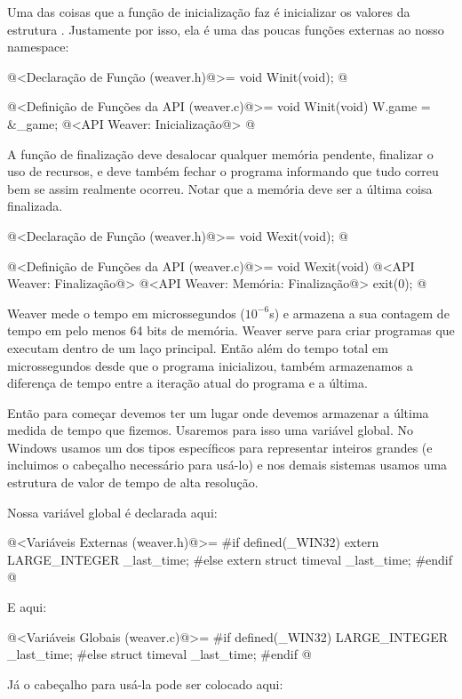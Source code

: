 Uma das coisas que a função de inicialização faz é inicializar os
valores da estrutura . Justamente por isso, ela é uma
das poucas funções externas ao nosso namespace:

\iniciocodigo
@<Declaração de Função (weaver.h)@>=
void Winit(void);
@
\fimcodigo

\iniciocodigo
@<Definição de Funções da API (weaver.c)@>=
void Winit(void){
  W.game = &_game;
  @<API Weaver: Inicialização@>
}
@
\fimcodigo

A função de finalização deve desalocar qualquer memória pendente,
finalizar o uso de recursos, e deve também fechar o programa
informando que tudo correu bem se assim realmente ocorreu. Notar que a
memória deve ser a última coisa finalizada.

\iniciocodigo
@<Declaração de Função (weaver.h)@>=
void Wexit(void);
@
\fimcodigo

\iniciocodigo
@<Definição de Funções da API (weaver.c)@>=
void Wexit(void){
  @<API Weaver: Finalização@>
  @<API Weaver: Memória: Finalização@>
  exit(0);
}
@
\fimcodigo



Weaver mede o tempo em microssegundos ($10^{-6}$s) e armazena a sua
contagem de tempo em pelo menos 64 bits de memória. Weaver serve para
criar programas que executam dentro de um laço principal. Então além
do tempo total em microssegundos desde que o programa inicializou,
também armazenamos a diferença de tempo entre a iteração atual do
programa e a última.

Então para começar devemos ter um lugar onde devemos armazenar a
última medida de tempo que fizemos. Usaremos para isso uma variável
global. No Windows usamos um dos tipos específicos para representar
inteiros grandes (e incluimos o cabeçalho necessário para usá-lo)
e nos demais sistemas usamos uma estrutura de valor de tempo de
alta resolução.

Nossa variável global é declarada aqui:

\iniciocodigo
@<Variáveis Externas (weaver.h)@>=
#if defined(_WIN32)
extern LARGE_INTEGER _last_time;
#else
extern struct timeval _last_time;
#endif
@
\fimcodigo

E aqui:

\iniciocodigo
@<Variáveis Globais (weaver.c)@>=
#if defined(_WIN32)
LARGE_INTEGER _last_time;
#else
struct timeval _last_time;
#endif
@
\fimcodigo

Já o cabeçalho para usá-la pode ser colocado aqui:

